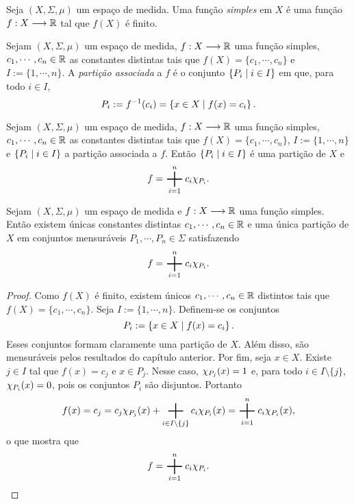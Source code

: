 \begin{defi}
Seja $(X,\Sigma,\mu)$ um espaço de medida. Uma função \emph{simples} em $X$ é uma função $f:X \longrightarrow \mathbb{R}$ tal que $f(X)$ é finito.
\end{defi}

\begin{defi}
Sejam $(X,\Sigma,\mu)$ um espaço de medida, $f: X \longrightarrow \mathbb{R}$ uma função simples, $c_1,\cdots,c_n \in \mathbb{R}$ as constantes distintas tais que $f(X)=\{c_1,\cdots,c_n\}$ e $I := \{1,\cdots,n\}$. A \emph{partição associada} a $f$ é o conjunto $\left\{P_i \;\middle\vert\; i \in I \right\}$ em que, para todo $i \in I$,
	\begin{equation*}
	P_i := f^{-1}(c_i) = \left\{x \in X \;\middle\vert\; f(x) = c_i \right\}.
	\end{equation*}
\end{defi}

\begin{prop}
Sejam $(X,\Sigma,\mu)$ um espaço de medida, $f: X \longrightarrow \mathbb{R}$ uma função simples, $c_1,\cdots,c_n \in \mathbb{R}$ as constantes distintas tais que $f(X)=\{c_1,\cdots,c_n\}$, $I := \{1,\cdots,n\}$ e $\left\{P_i \;\middle\vert\; i \in I \right\}$ a partição associada a $f$. Então $\left\{P_i \;\middle\vert\; i \in I \right\}$ é uma partição de $X$ e 
	\begin{equation*}
	f = \bigplus_{i=1}^n c_i \idc_{P_i}.
	\end{equation*}
\end{prop}

\begin{prop}
Sejam $(X,\Sigma,\mu)$ um espaço de medida e $f: X \longrightarrow \mathbb{R}$ uma função simples. Então existem únicas constantes distintas $c_1,\cdots,c_n \in \mathbb{R}$ e uma única partição de $X$ em conjuntos mensuráveis $P_1,\cdots,P_n \in \Sigma$ satisfazendo
	\begin{equation*}
	f = \bigplus_{i=1}^n c_i \idc_{P_i}.
	\end{equation*}
\end{prop}
\begin{proof}
Como $f(X)$ é finito, existem únicos $c_1,\cdots,c_n \in \mathbb{R}$ distintos tais que $f(X)=\{c_1,\cdots,c_n\}$. Seja $I := \{1,\cdots,n\}$. Definem-se os conjuntos
	\begin{equation*}
	P_i := \left\{x \in X \;\middle\vert\; f(x) = c_i \right\}.
	\end{equation*}
Esses conjuntos formam claramente uma partição de $X$. Além disso, são mensuráveis pelos resultados do capítulo anterior. Por fim, seja $x \in X$. Existe $j \in I$ tal que $f(x)=c_j$ e $x \in P_j$. Nesse caso, $\chi_{P_j}(x)=1$ e, para todo $i \in I\setminus\{j\}$, $\chi_{P_i}(x)=0$, pois os conjuntos $P_i$ são disjuntos. Portanto
	\begin{equation*}
	f(x) = c_j = c_j \idc_{P_j}(x) + \bigplus_{i \in I \setminus \{j\}} c_i \idc_{P_i}(x) = \bigplus_{i=1}^n c_i \idc_{P_i}(x),
	\end{equation*}o que mostra que
	\begin{equation*}
	f = \bigplus_{i=1}^n c_i \idc_{P_i}.
	\end{equation*}
\end{proof}

